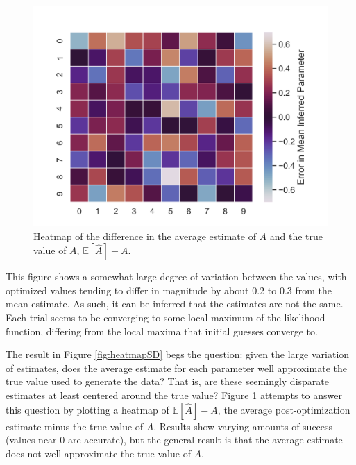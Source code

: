 \documentclass[12pt]{article}
\theoremstyle{definition}
\begin{document}
\begin{figure}[hbt!]
    \par
    \begin{center}
    \caption{Heatmap of the difference in the average estimate of $A$ and the true value of $A$, $\mathbb{E}[\hat{A}] - A$.}
    \label{fig:heatmapAVG}
    \includegraphics[scale=0.85]{Figures/heatmap_average_minus_true.png}
    \end{center}
    \par
    \vspace{-0.25in}
    \medskip
\end{figure}

\newpage

This figure shows a somewhat large degree of variation between the values, with optimized values tending to differ in magnitude by about $0.2$ to $0.3$ from the mean estimate. As such, it can be inferred that the estimates are not the same. Each trial seems to be converging to some local maximum of the likelihood function, differing from the local maxima that initial guesses converge to.

The result in Figure \ref{fig:heatmapSD} begs the question: given the large variation of estimates, does the average estimate for each parameter well approximate the true value used to generate the data? That is, are these seemingly disparate estimates at least centered around the true value? Figure \ref{fig:heatmapAVG} attempts to answer this question by plotting a heatmap of $\mathbb{E}[\hat{A}] - A$, the average post-optimization estimate minus the true value of $A$. Results show varying amounts of success (values near $0$ are accurate), but the general result is that the average estimate does not well approximate the true value of $A$.
\end{document}
